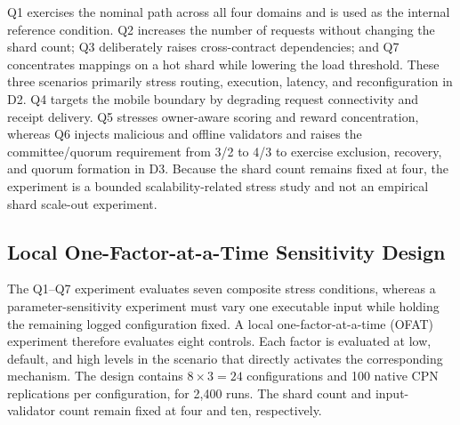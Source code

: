 \documentclass[a4paper,fleqn]{cas-sc}
\begin{document}
Q1 exercises the nominal path across all four domains and is used as the
internal reference condition. Q2 increases the number of requests without
changing the shard count; Q3 deliberately raises cross-contract dependencies;
and Q7 concentrates mappings on a hot shard while lowering the load threshold.
These three scenarios primarily stress routing, execution, latency, and
reconfiguration in D2. Q4 targets the mobile boundary by degrading request
connectivity and receipt delivery. Q5 stresses owner-aware scoring and reward
concentration, whereas Q6 injects malicious and offline validators and raises
the committee/quorum requirement from 3/2 to 4/3 to exercise exclusion,
recovery, and quorum formation in D3. Because the shard count remains fixed at
four, the experiment is a bounded scalability-related stress study and not an
empirical shard scale-out experiment.

\subsection{Local One-Factor-at-a-Time Sensitivity Design}
\label{subsec:sensitivity_design}

The Q1--Q7 experiment evaluates seven composite stress conditions, whereas a
parameter-sensitivity experiment must vary one executable input while holding
the remaining logged configuration fixed. A local one-factor-at-a-time (OFAT)
experiment therefore evaluates eight controls. Each factor is
evaluated at low, default, and high levels in the scenario that directly
activates the corresponding mechanism. The design contains $8\times3=24$
configurations and 100 native CPN replications per configuration, for 2,400
runs. The shard count and input-validator count remain fixed at four and ten,
respectively.
\end{document}
